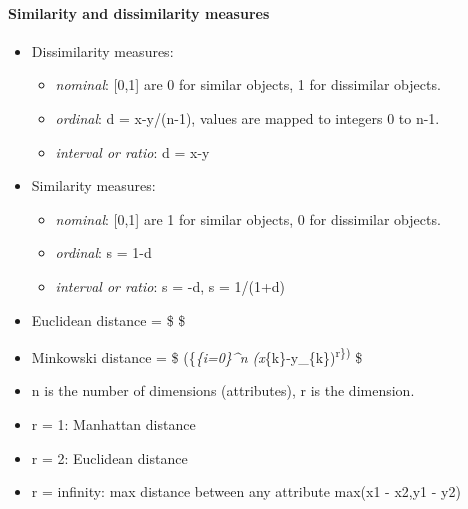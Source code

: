 \documentclass[11pt]{article}
\providecommand{\tightlist}{%
      \setlength{\itemsep}{0pt}\setlength{\parskip}{0pt}}
\begin{document}
    \paragraph{Similarity and dissimilarity
measures}\label{similarity-and-dissimilarity-measures}

    \begin{itemize}
\tightlist
\item
  Dissimilarity measures:

  \begin{itemize}
  \tightlist
  \item
    \emph{nominal}: {[}0,1{]} are 0 for similar objects, 1 for
    dissimilar objects.
  \item
    \emph{ordinal}: d = \textbar{}x-y\textbar{}/(n-1), values are mapped
    to integers 0 to n-1.
  \item
    \emph{interval or ratio}: d = \textbar{}x-y\textbar{}
  \end{itemize}
\item
  Similarity measures:

  \begin{itemize}
  \tightlist
  \item
    \emph{nominal}: {[}0,1{]} are 1 for similar objects, 0 for
    dissimilar objects.
  \item
    \emph{ordinal}: s = 1-d
  \item
    \emph{interval or ratio}: s = -d, s = 1/(1+d)
  \end{itemize}
\end{itemize}

    \begin{itemize}
\tightlist
\item
  Euclidean distance = \$  \$
\end{itemize}

    \begin{itemize}
\tightlist
\item
  Minkowski distance = \$ (\{\sum\emph{\{i=0\}\^{}n
  (x}\{k\}-y\_\{k\})\textsuperscript{r\})} \$
\end{itemize}

    \begin{itemize}
\tightlist
\item
  n is the number of dimensions (attributes), r is the dimension.
\item
  r = 1: Manhattan distance
\item
  r = 2: Euclidean distance
\item
  r = infinity: max distance between any attribute max(\textbar{}x1 -
  x2\textbar{},\textbar{}y1 - y2\textbar{})
\end{itemize}
\end{document}
